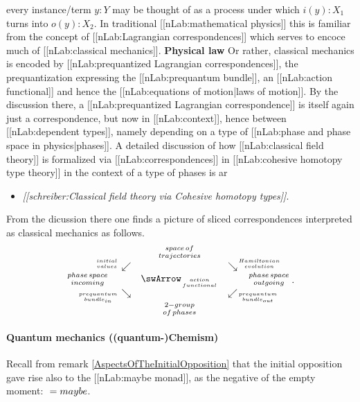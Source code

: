 \documentclass[12pt,titlepage]{article}
\def\mathllap{\mathpalette\mathllapinternal}
\def\mathrlap{\mathpalette\mathrlapinternal}
\def\mathllapinternal#1#2{\llap{$\mathsurround=0pt#1{#2}$}}
\def\mathrlapinternal#1#2{\rlap{$\mathsurround=0pt#1{#2}$}}
\newcommand{\itexarray}[1]{\begin{matrix}#1\end{matrix}}
\theoremstyle{plain}
\theoremstyle{definition}
\theoremstyle{remark}
\begin{document}
every instance/term $y\colon Y$ may be thought of as a process under which $i(y) \colon X_1$ turns into $o(y) \colon X_2$.
In traditional [[nLab:mathematical physics]] this is familiar from the concept of [[nLab:Lagrangian correspondences]] which serves to encoce much of [[nLab:classical mechanics]].
\textbf{Physical law}
Or rather, classical mechanics is encoded by [[nLab:prequantized Lagrangian correspondences]], the prequantization expressing the [[nLab:prequantum bundle]], an [[nLab:action functional]] and hence the [[nLab:equations of motion|laws of motion]].
By the discussion there, a [[nLab:prequantized Lagrangian correspondence]] is itself again just a correspondence, but now in [[nLab:context]], hence between [[nLab:dependent types]], namely depending on a type of [[nLab:phase and phase space in physics|phases]].
A detailed discussion of how [[nLab:classical field theory]] is formalized via [[nLab:correspondences]] in [[nLab:cohesive homotopy type theory]] in the context of a type of phases is ar
\begin{itemize}%
\item \emph{[[schreiber:Classical field theory via Cohesive homotopy types]]}.
\end{itemize}
From the dicussion there one finds a picture of sliced correspondences interpreted as classical mechanics as follows.
\begin{displaymath}
\itexarray{
    && {{space\,of} \atop {trajectories}}
    \\
    & {}^{\mathllap{{initial}\atop {values}}}\swarrow && \searrow^{\mathrlap{{Hamiltonian} \atop {evolution}}}
    \\
    {{phase\,space} \atop {incoming}}
  && \swArrow_{{action} \atop {functional}} && {{phase\,space} \atop {outgoing}}
    \\
    & {}_{\mathllap{{prequantum}\atop {bundle}_{in}}}\searrow
    &&
    \swarrow_{\mathrlap{{prequantum} \atop {bundle}_{out}}}
    \\
    && {{2-group} \atop {of\,phases}}
  }
  \,.
\end{displaymath}
\hypertarget{quantum_mechanics_quantumchemism}{}\paragraph*{{Quantum mechanics ((quantum-)Chemism)}}\label{quantum_mechanics_quantumchemism}
Recall from remark \ref{AspectsOfTheInitialOpposition} that the initial opposition gave rise also to the [[nLab:maybe monad]], as the negative of the empty moment: $\overline{\empty} = maybe$.
\end{document}
